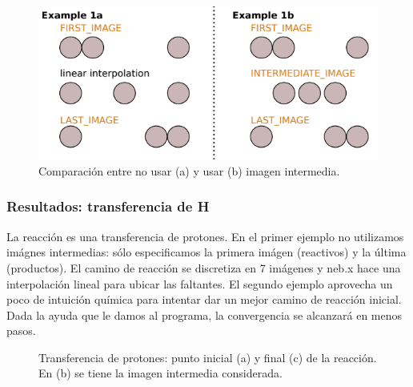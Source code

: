     \begin{figure}[H]
        \centering
          \includegraphics[scale = 0.6]{figs/D3/imagen_intermedia.png}
         \caption{Comparación entre no usar (a) y usar (b) imagen intermedia.}
     \end{figure}

\subsubsection{Resultados: transferencia de H}

  La reacción es una transferencia de protones. En el primer ejemplo no utilizamos imágnes intermedias: sólo especificamos la primera imágen (reactivos) y la última (productos). El camino de reacción se discretiza en 7 imágenes y neb.x hace una interpolación lineal para ubicar las faltantes. El segundo ejemplo aprovecha un poco de intuición química para intentar dar un mejor camino de reacción inicial. Dada la ayuda que le damos al programa, la convergencia se alcanzará en menos pasos.


  \begin{figure}[H]
      \centering
       \caption{Transferencia de protones: punto inicial (a) y final (c) de la reacción. En (b) se tiene la imagen intermedia considerada.}
   \end{figure}

